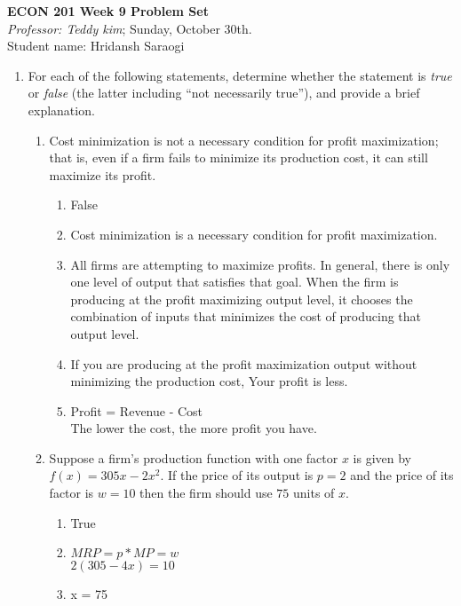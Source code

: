 \documentclass[11pt]{article}
\begin{document}
\begin{center}
\textbf{ECON 201 Week 9 Problem Set}\\
\textit {Professor: Teddy kim};  
Sunday, October 30th.
\\Student name: Hridansh Saraogi
\end{center}


\begin{enumerate}
\item For each of the following statements, determine whether
the statement is \emph{true} or \emph{false} (the latter including ``not necessarily true''), and provide a brief explanation.
    \begin{enumerate}

    \item Cost minimization is not a necessary condition for profit maximization; that is, even if a firm fails to minimize its production cost, it can still maximize its profit.
    \begin{enumerate}
        \item False
        \item Cost minimization is a necessary condition for profit maximization.
        \item All firms are attempting to maximize profits. In general, there is only one level of output that satisfies that goal. When the firm is producing at the profit maximizing output level, it chooses the combination of inputs that minimizes the cost of producing that output level.
        \item If you are producing at the profit maximization output without minimizing the production cost, Your profit is less.
        \item Profit = Revenue - Cost\\The lower the cost, the more profit you have.
    \end{enumerate}

    \item Suppose a firm's production function with one factor $x$ is given by $f(x)=305x-2x^{2}$. If the price of its output is $p=2$ and the price of its factor is $w=10$ then the firm should use $75$ units of $x$.
    \begin{enumerate}
        \item True
        \item $MRP = p * MP = w$\\
        $2(305-4x)=10$
        \item x = 75
        

\end{enumerate}
\end{enumerate}
\end{enumerate}
\end{document}
